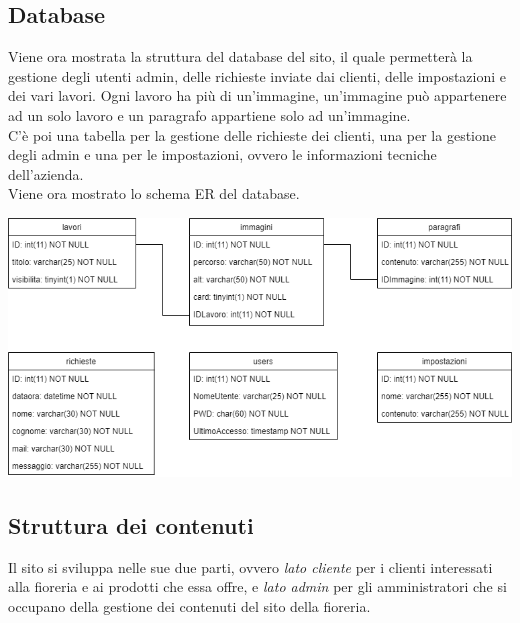 \subsection{Database}
Viene ora mostrata la struttura del database del sito, il quale permetterà la gestione degli utenti admin, delle richieste inviate dai clienti, delle impostazioni e dei vari lavori. Ogni lavoro ha più di un'immagine, un'immagine può appartenere ad un solo lavoro e un paragrafo appartiene solo ad un'immagine.\\C'è poi una tabella per la gestione delle richieste dei clienti, una per la gestione degli admin e una per le impostazioni, ovvero le informazioni tecniche dell'azienda. \\Viene ora mostrato lo schema ER del database.
\begin{center}
\includegraphics[scale = 0.5]{../latex/images/db.png}\\[1.5cm]
\end{center}

\subsection{Struttura dei contenuti}
Il sito si sviluppa nelle sue due parti, ovvero \textit{lato cliente} per i clienti interessati alla fioreria e ai prodotti che essa offre, e \textit{lato admin} per gli amministratori che si occupano della gestione dei contenuti del sito della fioreria. 


